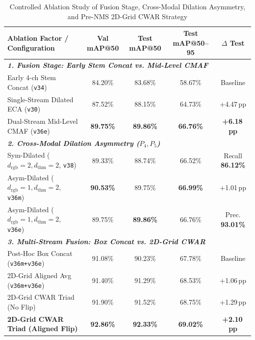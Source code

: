 \documentclass[journal,twoside,web]{ieeecolor}
\begin{document}
\begin{table}[t]
\centering
\caption{Controlled Ablation Study of Fusion Stage, Cross-Modal Dilation Asymmetry, and Pre-NMS 2D-Grid CWAR Strategy}
\label{tab:ablation_registration_dilation_cwar}
\small
\renewcommand{\arraystretch}{1.18}
\setlength{\tabcolsep}{3.8pt}
\begin{tabular}{l c c c c}
\toprule
\textbf{Ablation Factor / Configuration} & \textbf{Val mAP@50} & \textbf{Test mAP@50} & \textbf{Test mAP@50--95} & \textbf{$\Delta$ Test} \\
\midrule
\multicolumn{5}{l}{\textit{\textbf{1. Fusion Stage: Early Stem Concat vs. Mid-Level CMAF}}} \\
Early 4-ch Stem Concat (\texttt{v34})    & 84.20\% & 83.68\% & 58.67\% & Baseline \\
Single-Stream Dilated ECA (\texttt{v30}) & 87.52\% & 88.15\% & 64.73\% & +4.47\,pp \\
Dual-Stream Mid-Level CMAF (\texttt{v36e})& \textbf{89.75\%} & \textbf{89.86\%} & \textbf{66.76\%} & \textbf{+6.18\,pp} \\
\midrule
\multicolumn{5}{l}{\textit{\textbf{2. Cross-Modal Dilation Asymmetry ($P_4, P_5$)}}} \\
Sym-Dilated ($d_{\text{rgb}}{=}2, d_{\text{thm}}{=}2$, \texttt{v38}) & 89.33\% & 88.74\% & 66.52\% & Recall \textbf{86.12\%} \\
Asym-Dilated ($d_{\text{rgb}}{=}1, d_{\text{thm}}{=}2$, \texttt{v36m})& \textbf{90.53\%} & 89.75\% & \textbf{66.99\%} & +1.01\,pp \\
Asym-Dilated ($d_{\text{rgb}}{=}1, d_{\text{thm}}{=}2$, \texttt{v36e})& 89.75\% & \textbf{89.86\%} & 66.76\% & Prec. \textbf{93.01\%} \\
\midrule
\multicolumn{5}{l}{\textit{\textbf{3. Multi-Stream Fusion: Box Concat vs. 2D-Grid CWAR}}} \\
Post-Hoc Box Concat (\texttt{v36m+v36e}) & 91.08\% & 90.23\% & 67.78\% & Baseline \\
2D-Grid Aligned Avg (\texttt{v36m+v36e}) & 91.40\% & 91.29\% & 68.53\% & +1.06\,pp \\
2D-Grid CWAR Triad (No Flip)             & 91.90\% & 91.52\% & 68.75\% & +1.29\,pp \\
\rowcolor{gray!14}
\textbf{2D-Grid CWAR Triad (Aligned Flip)}& \textbf{92.86\%} & \textbf{92.33\%} & \textbf{69.02\%} & \textbf{+2.10\,pp} \\
\bottomrule
\end{tabular}
\end{table}
\end{document}
